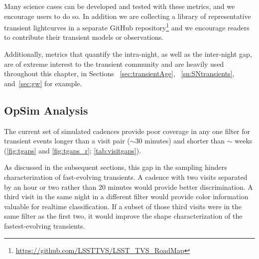 Many science cases can be developed and tested with these metrics, and we encourage users to do so. In addition we are collecting a library of representative transient lightcurves in a separate GitHub repository\footnote{\url{https://github.com/LSSTTVS/LSST_TVS_RoadMap}} and we encourage readers to contribute their transient models or observations.

Additionally, metrics that quantify the intra-night, as well as the inter-night gap, are of extreme interest to the transient community and are heavily used throughout this chapter, in Sections ~\ref{sec:transientAge}, ~\ref{sn:SNtransients}, and~\ref{sec:gw} for example.



\subsection{OpSim Analysis}
\label{sec:\chpname:analysis}

The current set of simulated cadences
provide poor coverage in any one
filter for transient events longer than a visit pair ($\sim$30
minutes) and shorter than $\sim$ weeks (\autoref{fig:tgaps} and 
\autoref{fig:tgaps_r}; \autoref{tab:visitgaps}).

As discussed in the subsequent sections, this
gap in the sampling hinders characterization of fast-evolving
transients.  A cadence with two visits separated by an hour or two rather
than 20 minutes would provide better discrimination.  A third visit in the
same night in a different filter would provide
color information valuable for realtime classification.
If a subset of those third
visits were in the same filter as the first two, it would improve the shape
characterization of the fastest-evolving transients.


